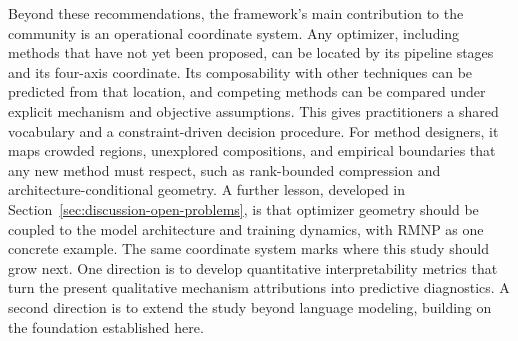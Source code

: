 Beyond these recommendations, the framework's main contribution to the
community is an operational coordinate system. Any optimizer, including methods
that have not yet been proposed, can be located by its pipeline stages and its
four-axis coordinate. Its composability with other techniques can be predicted from that
location, and competing methods can be compared under
explicit mechanism and objective assumptions.
This gives practitioners a shared vocabulary and a constraint-driven decision
procedure. For method designers, it maps crowded regions, unexplored
compositions, and empirical boundaries that any new method must respect, such as
rank-bounded compression and architecture-conditional geometry. A further
lesson, developed in Section~\ref{sec:discussion-open-problems}, is that
optimizer geometry should be coupled to the model architecture and training
dynamics, with RMNP as one concrete example. The
same coordinate system marks where this study should grow next. One direction is to develop
quantitative interpretability metrics that turn the present qualitative mechanism
attributions into predictive diagnostics. A
second direction is to extend the study beyond language modeling, building on the
foundation established here.
